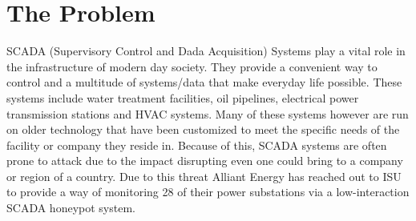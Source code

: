 \section*{The Problem}
SCADA (Supervisory Control and Dada Acquisition) Systems play a vital role in
the infrastructure of modern day society. They provide a convenient way to
control and a multitude of systems/data that make everyday life possible. These
systems include water treatment facilities, oil pipelines, electrical power
transmission stations and HVAC systems. Many of these systems however are run
on older technology that have been customized to meet the specific needs of the
facility or company they reside in. Because of this, SCADA systems are often
prone to attack due to the impact disrupting even one could bring to a company 
or region of a country. Due to this threat Alliant Energy has reached out to
ISU to provide a way of monitoring 28 of their power substations via a
low-interaction SCADA honeypot system.
